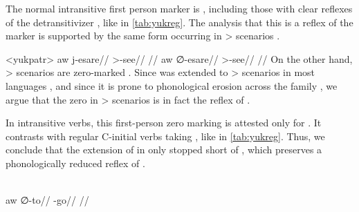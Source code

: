 

The normal intransitive first person marker is , including those with clear reflexes of the detransitivizer \detrz, like   in \cref{tab:yukreg}.
The analysis that this is a reflex of the  marker  is supported by the same form occurring in > scenarios .

\pex<yukpatr>\yukpa \parencite[][139]{meira2006syntactic}
\begingl
\gla aw j-esare//
\glb {} >-see//
\glft {}//
\endgl
{}
\begingl
\gla aw {\normalfont ∅}-esare//
\glb {} >-see//
\glft {}//
\endgl
\xe
On the other hand, > scenarios are zero-marked .
Since \PC {}  was extended to > scenarios in most languages \parencite[81--82]{gildea1998}, and since it is prone to phonological erosion across the family , we argue that the zero in > scenarios is in fact the \yukpa reflex of .

In intransitive verbs, this first-person zero marking is attested only for   .
It contrasts with regular C-initial verbs taking , like  in \cref{tab:yukreg}.
Thus, we conclude that the extension of  in \yukpa only stopped short of  , which preserves a phonologically reduced reflex of .

\yukpa \parencite[][139]{meira2006syntactic}\\
\begingl
\gla aw {\normalfont ∅}-to//
\glb {} -go//
\glft {}//
\endgl
\xe